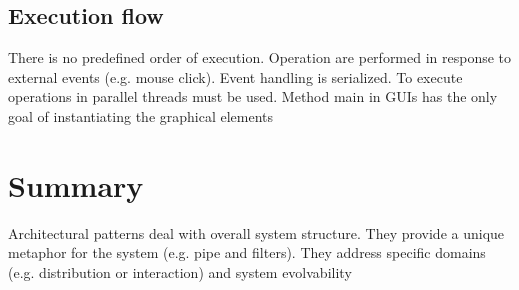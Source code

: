 \subsection{Execution flow}

There is no predefined order of execution. Operation are performed in response to external
events (e.g. mouse click). Event handling is serialized. To execute operations in parallel threads must be
used. Method main in GUIs has the only goal of instantiating the graphical elements

\section{Summary}

Architectural patterns deal with overall system
structure. They provide a unique metaphor for the system
(e.g. pipe and filters). They address specific domains (e.g. distribution or
interaction) and system evolvability



